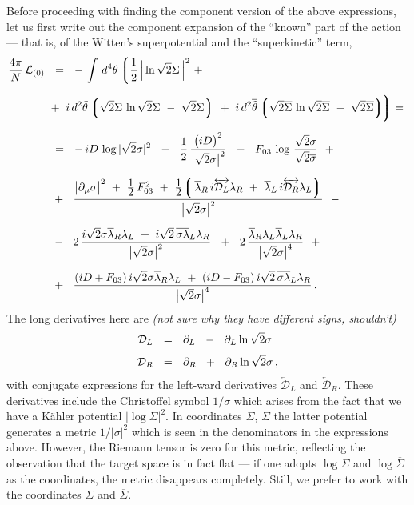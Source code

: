 \documentclass[epsfig,12pt]{article}
\newcommand{\cell}{{\mathcal L}}
\newcommand{\p}{\partial}
\newcommand{\ov}{\overline}
\newcommand{\md}{\mathcal{D}}
\newcommand{\lgr}{\left\lgroup}
\newcommand{\rgr}{\right\rgroup}
\begin{document}
	Before proceeding with finding the component version of the above expressions, let
	us first write out the component expansion of the ``known'' part of the action --- that is, 
	of the Witten's superpotential and the ``superkinetic'' term,
\begin{align}
%
\notag
	\frac{4\pi}{N}\, \cell_{(0)} &    ~~=~~
	-\, \int\, d^4\theta\, \bigg\lgroup \frac{1}{2}\, \Big| \ln \sqrt{2}\Sigma \, \Big|^2
			~+~ 
	\\[2mm]
%
\notag
	&
			~+~
			i\, d^2\tilde\theta 
			\lgr \sqrt{2}\Sigma\, \ln \sqrt{2}\Sigma  ~-~ \sqrt{2}\Sigma \rgr
			~+~
			i\, d^2\ov{\tilde\theta}
			\lgr \sqrt{2}\ov\Sigma\, \ln \sqrt{2}\ov\Sigma  ~-~ \sqrt{2}\ov\Sigma \rgr
			\!\!\bigg\rgroup
			=~ 
	\\[2mm]
%
\notag
	&     ~~=~~
	-\,iD\, \log |\sqrt{2}\sigma|^2  ~~-~~  \frac{1}{2}\, \frac{ \big(i D\big)^2 } { \big|\sqrt{2}\sigma\big|^2 }
	~~-~~ F_{03}\, \log\, \frac{\sqrt{2}\sigma}{\sqrt{2}\ov\sigma}
	~~+~~
	\\[2mm]
%
\label{L0}
	&
	~~+~~ \frac{
		\big|\p_\mu \sigma\big|^2  ~+~  \frac{\displaystyle 1}{\displaystyle 2}\,F_{03}^2  ~+~
		\frac{\displaystyle 1}{\displaystyle 2}\!
			    \lgr\, \ov\lambda{}_R\, i\overleftrightarrow{\md_L} \lambda_R  ~+~ 
				   \ov\lambda{}_L\, i\overleftrightarrow{\md_R} \lambda_L \rgr
		} { \big|\sqrt{2}\sigma\big|^2 }
	~~-~~
	\\[2mm]
%
\notag
	&
	~~-~~ 2\,\frac{
			i\sqrt{2}\sigma\ov\lambda{}_R\lambda_L  ~+~  
			i\sqrt{2}\,\ov{\sigma\lambda}{}_L\lambda_R
		} { \big|\sqrt{2}\sigma\big|^2 }
	~~+~~ 2\, \frac{
			\ov\lambda{}_R \lambda_L \ov\lambda{}_L \lambda_R
		} { \big|\sqrt{2}\sigma\big|^4 }
	~~+~~
	\\[2mm]
%
\notag
	&
	~~+~~
	\frac{	(iD + F_{03})\, i\sqrt{2}\sigma \ov\lambda{}_R\lambda_L ~+~
		(iD - F_{03})\, i\sqrt{2}\,\ov{\sigma \lambda}{}_L\lambda_R  }
		{ \big|\sqrt{2}\sigma\big|^4 }\,.
\end{align}
	The long derivatives here are {\it (not sure why they have different signs, shouldn't)}
\begin{align}
%
\notag
	\md_L &    ~~=~~    \p_L  ~~-~~  \p_L \ln \sqrt{2}\sigma
	\\[1mm]
%
	\md_R &    ~~=~~    \p_R  ~~+~~  \p_R \ln \sqrt{2}\sigma\,,
\end{align}
	with conjugate expressions for the left-ward derivatives 
	$ \overleftarrow{\md}{}_L $ and $ \overleftarrow{\md}{}_R $.
	These derivatives include the Christoffel symbol $ 1 / \sigma $ which arises from
	the fact that we have a  K\"ahler potential $ \big| \log \Sigma \big|^2 $.
	In coordinates $ \Sigma $, $ \ov\Sigma $ the latter potential generates a metric $ 1 / |\sigma|^2 $
	which is seen in the denominators in the expressions above.
	However, the Riemann tensor is zero for this metric, reflecting the
	observation that the target space is in fact flat ---
	if one adopts $ \log \Sigma $ and $ \log \ov\Sigma $ as the coordinates, the metric
	disappears completely.
	Still, we prefer to work with the coordinates $ \Sigma $ and $ \ov\Sigma $.
\end{document}
